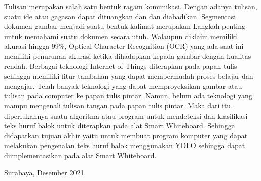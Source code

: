   Tulisan merupakan salah satu bentuk ragam komunikasi. Dengan adanya tulisan, suatu ide atau gagasan dapat dituangkan dan dan diabadikan. Segmentasi dokumen gambar menjadi suatu bentuk kalimat merupakan Langkah penting untuk memahami suatu dokumen secara utuh. Walaupun diklaim memiliki akurasi hingga 99\%, Optical Character Recognition (OCR) yang ada saat ini memiliki penurunan akurasi ketika dihadapkan kepada gambar dengan kualitas rendah. Berbagai teknologi Internet of Things diterapkan pada papan tulis sehingga memiliki fitur tambahan yang dapat mempermudah proses belajar dan mengajar. Telah banyak teknologi yang dapat memproyeksikan gambar atau tulisan pada computer ke papan tulis pintar. Namun, belum ada teknologi yang mampu mengenali tulisan tangan pada papan tulis pintar. Maka dari itu, diperlukannya suatu algoritma atau program untuk mendeteksi dan klasifikasi teks huruf balok untuk diterapkan pada alat Smart Whiteboard. Sehingga didapatkan tujuan akhir yaitu untuk membuat program komputer yang dapat melakukan pengenalan teks huruf balok menggunakan YOLO sehingga dapat diimplementasikan pada alat Smart Whiteboard.
    
  \vspace{1ex}
  
  \begin{flushright}
    Surabaya, Desember 2021
  \end{flushright}
  \vspace{1ex}
  
